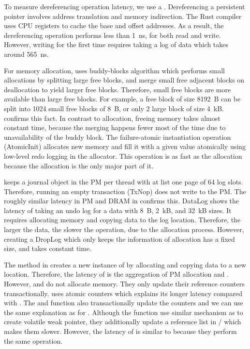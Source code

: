 To measure dereferencing operation latency, we use a . Dereferencing a persistent pointer involves address translation and memory indirection. The Rust compiler uses CPU registers to cache the base and offset addresses. As a result, the dereferencing operation performs less than 1~ns, for both read and write. However, writing for the first time requires taking a log of data which takes around 565~ns.

For memory allocation, \This{} uses buddy-blocks algorithm which performs small allocations by splitting large free blocks, and merge small free adjacent blocks on deallocation to yield larger free blocks. Therefore, small free blocks are more available than large free blocks. For example, a free block of size 8192~B can be split into 1024 small free blocks of 8~B, or only 2 large block of size 4~kB.  confirms this fact. In contrast to allocation, freeing memory takes almost constant time, because the merging happens fewer most of the time due to unavailability of the buddy block. The failure-atomic instantiation operation (AtomicInit) allocates new memory and fill it with a given value atomically using low-level redo logging in the allocator. This operation is as fast as the allocation because the allocation is the only major part of it.

\This{} keeps a journal object in the PM per thread with at list one page of 64 log slots. Therefore, running an empty transaction (TxNop) does not write to the PM. The roughly similar latency in PM and DRAM in  confirms this. DataLog shows the latency of taking an undo log for a data with 8~B, 2~kB, and 32~kB sizes. It requires allocating memory and copying data to the log location. Therefore, the larger the data, the slower the operation, due to the allocation process. However, creating a DropLog which only keeps the information of allocation has a fixed size, and takes constant time.

The  method in  creates a new instance of  by allocating and copying data to a new location. Therefore, the latency of  is the aggregation of PM allocation and \memcpy{}. However,  and  do not allocate memory. They only update their reference counters transactionally.  uses atomic counters which explains its longer latency compared with . The  and  function also transactionally update the counters and we can use the same explanation as for . Although the  function use similar mechanism as  to create volatile weak pointer, they additionally update a reference list in / which makes them slower. However, the latency of  is similar to  because they perform the same operation.

